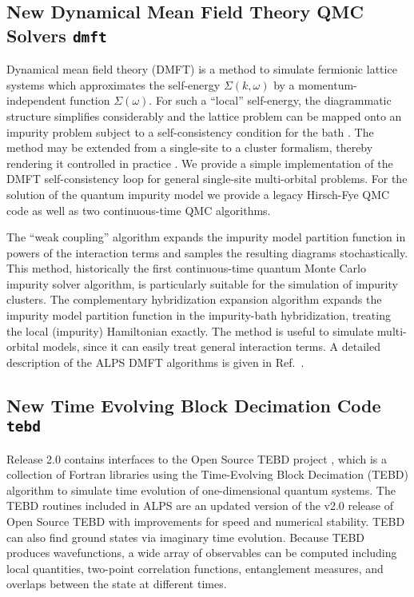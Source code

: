 \documentclass[12pt]{iopart}
\begin{document}
\subsection{New Dynamical Mean Field Theory QMC Solvers {\tt dmft}}
Dynamical mean field theory (DMFT) is a method to simulate fermionic lattice systems which approximates the self-energy $\Sigma(k,\omega)$ by a momentum-independent 
function $\Sigma(\omega)$. For such a ``local'' self-energy, the diagrammatic structure simplifies considerably and the lattice problem can be mapped onto an impurity problem subject to a self-consistency condition for the bath \cite{Georges96,Kotliar06}. The method may be extended from a single-site to a cluster formalism, thereby rendering it controlled in practice \cite{Maier05}.
We provide a simple implementation of the DMFT self-consistency loop for general single-site multi-orbital problems.
For the solution of the quantum impurity model we provide a legacy Hirsch-Fye QMC code \cite{Hirsch86} as well as two continuous-time QMC algorithms.

The ``weak coupling'' algorithm \cite{Rubtsov04,Rubtsov05} expands the impurity model partition function in powers of the interaction terms and samples the resulting diagrams stochastically. This method, historically
the first continuous-time quantum Monte Carlo impurity solver algorithm, is particularly suitable for the simulation of impurity clusters.
The complementary hybridization expansion algorithm \cite{Werner06,Werner06Kondo} expands the impurity model partition function in the impurity-bath hybridization, treating 
the local (impurity) Hamiltonian exactly. 
The method is useful to simulate multi-orbital models, since it can easily treat general interaction terms. A detailed description of the ALPS DMFT algorithms is given in Ref.~\cite{ALPSDMFT}.

\subsection{New Time Evolving Block Decimation Code {\tt tebd}}
Release 2.0 contains interfaces to the Open Source TEBD project \cite{ostebd}, which is a collection of Fortran libraries using the Time-Evolving Block Decimation (TEBD) algorithm \cite{vidal1, vidal2} to simulate time evolution of one-dimensional quantum systems.  The TEBD routines included in ALPS are an updated version of the v2.0 release of Open Source TEBD with improvements for speed and numerical stability.  TEBD can also find ground states via imaginary time evolution.  Because TEBD produces wavefunctions, a wide array of observables can be computed including local quantities, two-point correlation functions, entanglement measures, and overlaps between the state at different times.
\end{document}
